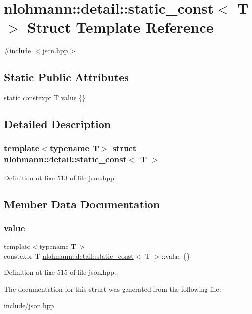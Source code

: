 \hypertarget{structnlohmann_1_1detail_1_1static__const}{}\section{nlohmann\+:\+:detail\+:\+:static\+\_\+const$<$ T $>$ Struct Template Reference}
\label{structnlohmann_1_1detail_1_1static__const}


{\ttfamily \#include $<$json.\+hpp$>$}

\subsection*{Static Public Attributes}
\begin{DoxyCompactItemize}
\item 
static constexpr T \hyperlink{structnlohmann_1_1detail_1_1static__const_a6bb7ab2ddd6abc41fb4ffb7c6dfa237e}{value} \{\}
\end{DoxyCompactItemize}


\subsection{Detailed Description}
\subsubsection*{template$<$typename T$>$\newline
struct nlohmann\+::detail\+::static\+\_\+const$<$ T $>$}



Definition at line 513 of file json.\+hpp.



\subsection{Member Data Documentation}
\mbox{\label{structnlohmann_1_1detail_1_1static__const_a6bb7ab2ddd6abc41fb4ffb7c6dfa237e}} 
\subsubsection{\texorpdfstring{value}{value}}
{\footnotesize\ttfamily template$<$typename T $>$ \\
constexpr T \hyperlink{structnlohmann_1_1detail_1_1static__const}{nlohmann\+::detail\+::static\+\_\+const}$<$ T $>$\+::value \{\}\hspace{0.3cm}{\ttfamily [static]}}



Definition at line 515 of file json.\+hpp.



The documentation for this struct was generated from the following file\+:\begin{DoxyCompactItemize}
\item 
include/\hyperlink{json_8hpp}{json.\+hpp}\end{DoxyCompactItemize}
